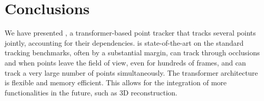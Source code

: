 \section{Conclusions}%
\label{s:conclusion}

We have presented \method, a transformer-based point tracker that tracks several points jointly, accounting for their dependencies.
\method is state-of-the-art on the standard tracking benchmarks, often by a substantial margin, can track through occlusions and when points leave the field of view, even for hundreds of frames, and can track a very large number of points simultaneously.
The transformer architecture is flexible and memory efficient. This allows for the integration of more functionalities in the future, such as 3D reconstruction.

